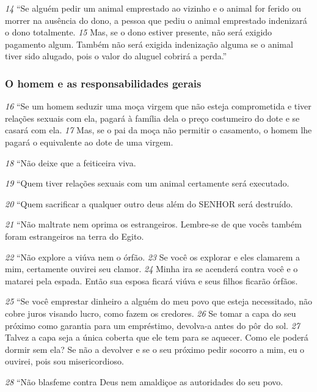 \smallskip
\textit{\tiny 14}
“Se alguém pedir um animal emprestado ao vizinho e o animal for ferido ou
morrer na ausência do dono, a pessoa que pediu o animal emprestado indenizará
o dono totalmente. 
\textit{\tiny 15}
Mas, se o dono estiver presente, não será exigido pagamento
algum. Também não será exigida indenização alguma se o animal tiver sido
alugado, pois o valor do aluguel cobrirá a perda.”

\bigskip
\subsubsection*{O homem e as responsabilidades gerais}
\textit{\tiny 16}
“Se um homem seduzir uma moça virgem que não esteja comprometida e tiver
relações sexuais com ela, pagará à família dela o preço costumeiro do dote e se
casará com ela. 
\textit{\tiny 17}
Mas, se o pai da moça não permitir o casamento, o homem lhe
pagará o equivalente ao dote de uma virgem.
   
\smallskip
\textit{\tiny 18}
“Não deixe que a feiticeira viva.
   
\smallskip
\textit{\tiny 19}
“Quem tiver relações sexuais com um animal certamente será executado.
   
\smallskip
\textit{\tiny 20}
“Quem sacrificar a qualquer outro deus além do SENHOR será destruído.
   
\smallskip
\textit{\tiny 21}
“Não maltrate nem oprima os estrangeiros. Lembre-se de que vocês também
foram estrangeiros na terra do Egito.
   
\smallskip
\textit{\tiny 22}
“Não explore a viúva nem o órfão. 
\textit{\tiny 23}
Se você os explorar e eles clamarem a
mim, certamente ouvirei seu clamor. 
\textit{\tiny 24}
Minha ira se acenderá contra você e o
matarei pela espada. Então sua esposa ficará viúva e seus filhos ficarão órfãos.
   
\smallskip
\textit{\tiny 25}
“Se você emprestar dinheiro a alguém do meu povo que esteja necessitado,
não cobre juros visando lucro, como fazem os credores. 
\textit{\tiny 26}
Se tomar a capa do seu
próximo como garantia para um empréstimo, devolva-a antes do pôr do sol.
\textit{\tiny 27}
Talvez a capa seja a única coberta que ele tem para se aquecer. Como ele poderá
dormir sem ela? Se não a devolver e se o seu próximo pedir socorro a mim, eu o
ouvirei, pois sou misericordioso.
   
\smallskip
\textit{\tiny 28}
“Não blasfeme contra Deus nem amaldiçoe as autoridades do seu povo.
   
